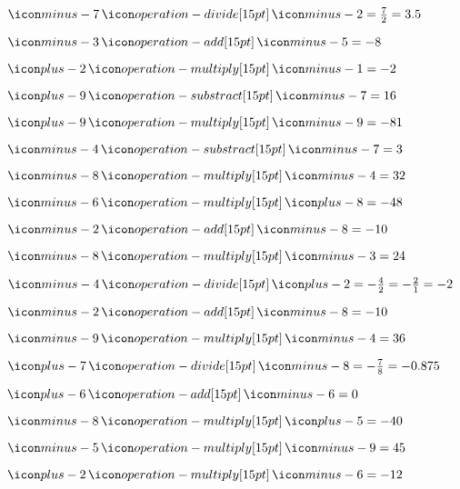 {{\item$\mseven \obelus \mtwo = \frac{7}{2} = 3.5$

\item$\mthree \plus \mfive = -8$

\item$\two \time \mone = -2$

\item$\nine \minus \mseven = 16$

\item$\nine \time \mnine = -81$

\item$\mfour \minus \mseven = 3$

\item$\meight \time \mfour = 32$

\item$\msix \time \eight = -48$

\item$\mtwo \plus \meight = -10$

\item$\meight \time \mthree = 24$

\item$\mfour \obelus \two = -\frac{4}{2} = -\frac{2}{1} = -2$

\item$\mtwo \plus \meight = -10$

\item$\mnine \time \mfour = 36$

\item$\seven \obelus \meight = -\frac{7}{8} = -0.875$

\item$\six \plus \msix = 0$

\item$\meight \time \five = -40$

\item$\mfive \time \mnine = 45$

\item$\two \time \msix = -12$

}}